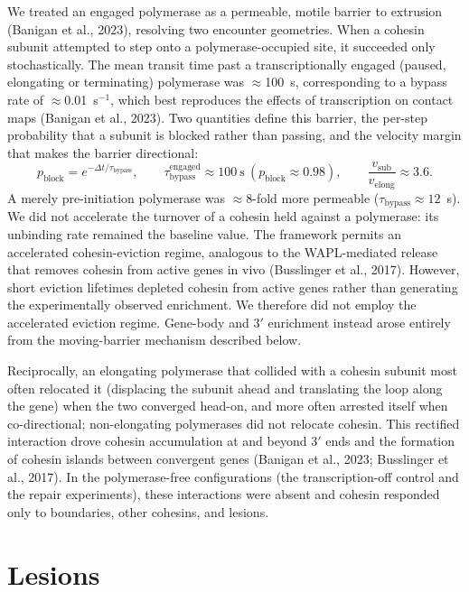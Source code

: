 \documentclass[11pt]{article}
\begin{document}
We treated an engaged polymerase as a permeable, motile barrier to extrusion
(Banigan et al., 2023), resolving two encounter geometries. When a cohesin subunit
attempted to step onto a polymerase-occupied site, it succeeded only stochastically.
The mean transit time past a transcriptionally engaged (paused, elongating or
terminating) polymerase was $\approx$100~s, corresponding to a bypass rate of
$\approx$0.01~s$^{-1}$, which best reproduces the effects of transcription on contact
maps (Banigan et al., 2023). Two quantities define this barrier, the per-step
probability that a subunit is blocked rather than passing, and the velocity margin
that makes the barrier directional:
%
\begin{equation}
p_{\mathrm{block}} = e^{-\Delta t/\tau_{\mathrm{bypass}}},
\qquad
\tau_{\mathrm{bypass}}^{\mathrm{engaged}} \approx 100\ \mathrm{s}\
(p_{\mathrm{block}}\approx0.98),
\qquad
\frac{v_{\mathrm{sub}}}{v_{\mathrm{elong}}} \approx 3.6.
\end{equation}
%
A merely pre-initiation polymerase was $\approx$8-fold more permeable
($\tau_{\mathrm{bypass}}\approx 12$~s). We did not accelerate the turnover of a
cohesin held against a polymerase: its unbinding rate remained the baseline value.
The framework permits an accelerated cohesin-eviction regime, analogous to the
WAPL-mediated release that removes cohesin from active genes in vivo (Busslinger et
al., 2017). However, short eviction lifetimes depleted cohesin from active genes
rather than generating the experimentally observed enrichment. We therefore did not
employ the accelerated eviction regime. Gene-body and 3$'$ enrichment instead arose
entirely from the moving-barrier mechanism described below.

Reciprocally, an elongating polymerase that collided with a cohesin subunit most
often relocated it (displacing the subunit ahead and translating the loop along
the gene) when the two converged head-on, and more often arrested itself when
co-directional; non-elongating polymerases did not relocate cohesin. This rectified
interaction drove cohesin accumulation at and beyond 3$'$ ends and the formation of
cohesin islands between convergent genes (Banigan et al., 2023; Busslinger et al.,
2017). In the polymerase-free configurations (the transcription-off control and the
repair experiments), these interactions were absent and cohesin responded only to
boundaries, other cohesins, and lesions.

\section{Lesions}
\end{document}
